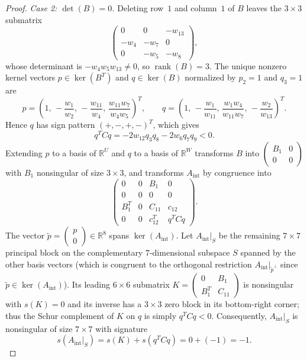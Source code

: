 \documentclass[10pt,letterpaper]{article}
\theoremstyle{zetaplain}
\theoremstyle{zetadef}
\theoremstyle{remark}
\numberwithin{equation}{section}
\DeclareMathOperator{\rank}{rank}
\begin{document}
\begin{proof}
\medskip
\emph{Case 2: $\det(B) = 0$.} Deleting row~$1$ and column~$1$ of $B$ leaves the $3 \times 3$ submatrix
\[
  \begin{pmatrix}
    0 & 0 & -w_{13} \\
    -w_4 & -w_7 & 0 \\
    0 & -w_5 & -w_8
  \end{pmatrix},
\]
whose determinant is $-w_4 w_5 w_{13} \ne 0$, so $\rank(B) = 3$. The unique nonzero kernel vectors $p \in \ker(B^T)$ and $q \in \ker(B)$ normalized by $p_2 = 1$ and $q_3 = 1$ are
\[
  p = \left(1,\, -\frac{w_1}{w_2},\, -\frac{w_{11}}{w_4},\, \frac{w_{11} w_7}{w_4 w_5}\right)^T, \qquad
  q = \left(1,\, -\frac{w_1}{w_{11}},\, \frac{w_1 w_4}{w_{11} w_7},\, -\frac{w_2}{w_{13}}\right)^T.
\]
Hence $q$ has sign pattern $(+, -, +, -)^T$, which gives
\[
  q^T C q = -2w_{12} q_3 q_8 - 2w_6 q_7 q_9 < 0.
\]
Extending $p$ to a basis of $\mathbb{R}^U$ and $q$ to a basis of $\mathbb{R}^W$ transforms $B$ into $\begin{pmatrix} B_1 & 0 \\ 0 & 0 \end{pmatrix}$ with $B_1$ nonsingular of size $3 \times 3$, and transforms $A_{\mathrm{int}}$ by congruence into
\[
  \begin{pmatrix}
    0 & 0 & B_1 & 0 \\
    0 & 0 & 0 & 0 \\
    B_1^T & 0 & C_{11} & c_{12} \\
    0 & 0 & c_{12}^T & q^T C q
  \end{pmatrix}.
\]
The vector $\tilde{p} = \begin{pmatrix} p \\ 0 \end{pmatrix} \in \mathbb{R}^8$ spans $\ker(A_{\mathrm{int}})$. Let $A_{\mathrm{int}}|_S$ be the remaining $7 \times 7$ principal block on the complementary $7$-dimensional subspace $S$ spanned by the other basis vectors (which is congruent to the orthogonal restriction $A_{\mathrm{int}}|_{\tilde{p}^\perp}$ since $\tilde{p} \in \ker(A_{\mathrm{int}})$). Its leading $6 \times 6$ submatrix $K = \begin{pmatrix} 0 & B_1 \\ B_1^T & C_{11} \end{pmatrix}$ is nonsingular with $s(K) = 0$ and its inverse has a $3 \times 3$ zero block in its bottom-right corner; thus the Schur complement of $K$ on $q$ is simply $q^T C q < 0$. Consequently, $A_{\mathrm{int}}|_S$ is nonsingular of size $7 \times 7$ with signature
\[
  s(A_{\mathrm{int}}|_S) = s(K) + s(q^T C q) = 0 + (-1) = -1.
\]


\end{proof}
\end{document}

